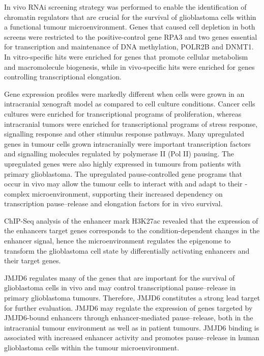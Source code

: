 In vivo RNAi screening strategy was performed to enable the identification of chromatin regulators that are crucial for the survival of glioblastoma cells within a functional tumour microenvironment. Genes that caused cell depletion in both screens were restricted to the positive-control gene RPA3 and two genes essential for transcription and maintenance of DNA methylation, POLR2B and DNMT1. In vitro-specific hits were enriched for genes that promote cellular metabolism and macromolecule biogenesis, while in vivo-specific hits were enriched for genes controlling transcriptional elongation.

Gene expression profiles were markedly different when cells were grown in an intracranial xenograft model as compared to cell culture conditions. Cancer cells cultures were enriched for transcriptional programs of proliferation, whereas intracranial tumors were enriched for transcriptional programs of stress response, signalling response and other stimulus response pathways. Many upregulated genes in tumour cells grown intracranially were important transcription factors and signalling molecules regulated by polymerase II (Pol II) pausing. The upregulated genes were also highly expressed in tumours from patients with primary glioblastoma. The upregulated pause-controlled gene programs that occur in vivo may allow the tumour cells to interact with and adapt to their ­complex microenvironment, supporting their increased dependency on transcription pause–release and elongation factors for in vivo survival.

ChIP-Seq analysis of the enhancer mark H3K27ac revealed that the expression of the enhancers target genes corresponds to the condition-dependent changes in the enhancer signal, hence the microenvironment regulates the epigenome to transform the glioblastoma cell state by differentially activating enhancers and their target genes.

JMJD6 regulates many of the genes that are important for the survival of glioblastoma cells in vivo and may control transcriptional pause–release in primary glioblastoma tumours. Therefore, JMJD6 constitutes a strong lead target for further evaluation. JMJD6 may regulate the expression of genes targeted by JMJD6-bound enhancers through enhancer-mediated pause–release, both in the intracranial tumour environment as well as in patient tumours. JMJD6 binding is associated with increased enhancer activity and promotes pause–release in human glioblastoma cells within the tumour microenvironment.

